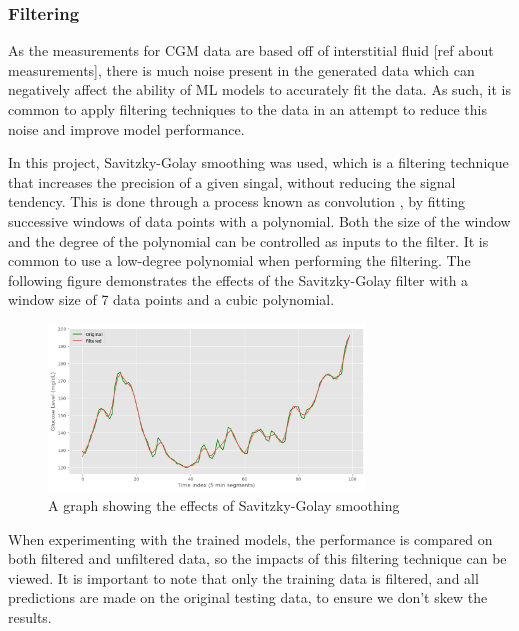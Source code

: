           \subsubsection{Filtering}

            As the measurements for CGM data are based off of interstitial fluid [ref about measurements], there is much noise present in the generated data which can negatively affect the ability of ML models to accurately fit the data. As such, it is common to apply filtering techniques to the data in an attempt to reduce this noise and improve model performance.

            In this project, Savitzky-Golay smoothing \cite{savgol} was used, which is a filtering technique that increases the precision of a given singal, without reducing the signal tendency. This is done through a process known as convolution \cite{convolution}, by fitting successive windows of data points with a polynomial. Both the size of the window and the degree of the polynomial can be controlled as inputs to the filter. It is common to use a low-degree polynomial when performing the filtering. The following figure demonstrates the effects of the Savitzky-Golay filter with a window size of 7 data points and a cubic polynomial.

            \begin{figure}[H]
              \centering
  
              \includegraphics[width=0.75\textwidth]{images/filtered.png} 
              \caption{
               A graph showing the effects of Savitzky-Golay smoothing
              }
            \end{figure}

            When experimenting with the trained models, the performance is compared on both filtered and unfiltered data, so the impacts of this filtering technique can be viewed. It is important to note that only the training data is filtered, and all predictions are made on the original testing data, to ensure we don't skew the results.

